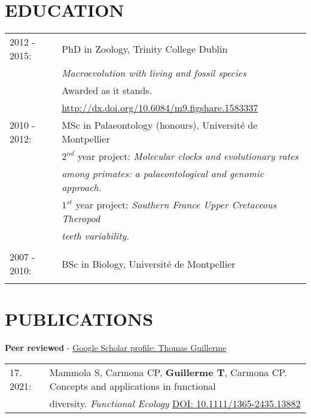 \documentclass[10pt,a4paper]{article}
\begin{document}
{\begin{tabular}{ll}
\end{tabular}

\section{EDUCATION}
\raggedright
\begin{tabular}{ll} 
2012 - 2015: & PhD in Zoology, Trinity College Dublin\\
& \textit{Macroevolution with living and fossil species} \\
& Awarded as it stands. \\
& \href{http://figshare.com/articles/Macroevolution_with_living_and_fossil_species/1583337}{http://dx.doi.org/10.6084/m9.figshare.1583337} \\
2010 - 2012: & MSc in Palaeontology (honours), Universit\'{e} de Montpellier\\
& $2^{nd}$ year project: \textit{Molecular clocks and evolutionary rates}\\
& \textit{among primates: a palaeontological and genomic approach.} \\
& $1^{st}$ year project: \textit{Southern France Upper Cretaceous Theropod}\\
& \textit{teeth variability.} \\
& \\
2007 - 2010: & BSc in Biology, Universit\'{e} de Montpellier\\
& \\
\end{tabular}

\section{PUBLICATIONS}
\raggedright\textbf{Peer reviewed} - \href{https://scholar.google.co.uk/citations?user=LA9l9EkAAAAJ&hl=en}{Google Scholar profile: Thomas Guillerme}\\[1.5ex]

\begin{tabular}{ll}
17. 2021: & Mammola S, Carmona CP, \textbf{Guillerme T}, Carmona CP. Concepts and applications in functional\\
      & diversity. \textit{Functional Ecology} \href{https://besjournals.onlinelibrary.wiley.com/doi/10.1111/1365-2435.13882}{DOI: 10.1111/1365-2435.13882}\\
\end{tabular}
\bigskip

}
\end{document}
